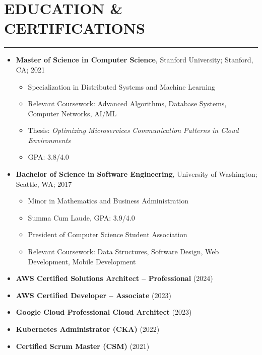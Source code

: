 \documentclass[a4paper,10pt]{article}           %
\begin{document}
    \section*{EDUCATION \& CERTIFICATIONS}
    \vspace{-0.5em}
    \hrule
    \vspace{0.3cm}
    \begin{itemize}[leftmargin=0.2cm, itemsep=0pt, label=--]
        \item \textbf{Master of Science in Computer Science}, Stanford University; Stanford, CA; 2021
        \begin{itemize}[leftmargin=0.4cm, itemsep=0pt, label=$\circ$]
            \item Specialization in Distributed Systems and Machine Learning
            \item Relevant Coursework: Advanced Algorithms, Database Systems, Computer Networks, AI/ML
            \item Thesis: \textit{Optimizing Microservices Communication Patterns in Cloud Environments}
            \item GPA: 3.8/4.0
        \end{itemize}
        \item \textbf{Bachelor of Science in Software Engineering}, University of Washington; Seattle, WA; 2017
        \begin{itemize}[leftmargin=0.4cm, itemsep=0pt, label=$\circ$]
            \item Minor in Mathematics and Business Administration
            \item Summa Cum Laude, GPA: 3.9/4.0
            \item President of Computer Science Student Association
            \item Relevant Coursework: Data Structures, Software Design, Web Development, Mobile Development
        \end{itemize}
        \item \textbf{AWS Certified Solutions Architect – Professional} (2024)
        \item \textbf{AWS Certified Developer – Associate} (2023)
        \item \textbf{Google Cloud Professional Cloud Architect} (2023)
        \item \textbf{Kubernetes Administrator (CKA)} (2022)
        \item \textbf{Certified Scrum Master (CSM)} (2021)
    \end{itemize}
\end{document}
